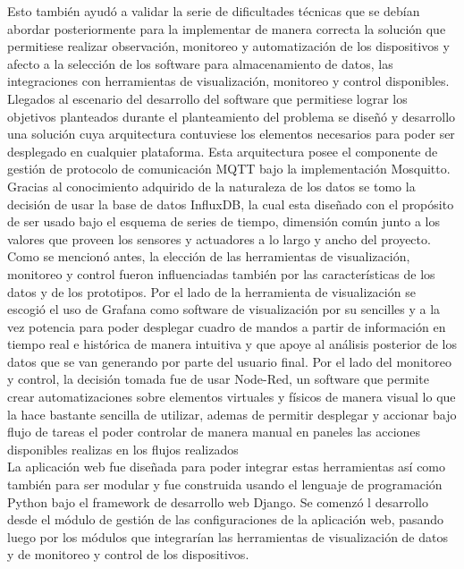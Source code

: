 Esto también ayudó a validar la serie de dificultades técnicas que se debían abordar posteriormente para la implementar de manera correcta la solución que permitiese realizar observación, monitoreo y automatización de los dispositivos y afecto a la selección de los software para almacenamiento de datos, las integraciones con herramientas de visualización, monitoreo y control disponibles.\\

Llegados al escenario del desarrollo del software que permitiese lograr los objetivos planteados durante el planteamiento del problema se diseñó y desarrollo una solución cuya arquitectura contuviese los elementos necesarios para poder ser desplegado en cualquier plataforma. Esta arquitectura posee el componente de gestión de protocolo de comunicación MQTT bajo la implementación Mosquitto. Gracias al conocimiento adquirido de la naturaleza de los datos se tomo la decisión de usar la base de datos InfluxDB, la cual esta diseñado con el propósito de ser usado bajo el esquema de series de tiempo, dimensión común junto a los valores que proveen los sensores y actuadores a lo largo y ancho del proyecto.\\

Como se mencionó antes, la elección de las herramientas de visualización, monitoreo y control fueron influenciadas también por las características de los datos y de los prototipos. Por el lado de la herramienta de visualización se escogió el uso de Grafana como software de visualización por su sencilles y a la vez potencia para poder desplegar cuadro de mandos a partir de información en tiempo real e histórica de manera intuitiva y que apoye al análisis posterior de los datos que se van generando por parte del usuario final. Por el lado del monitoreo y control, la decisión tomada fue de usar Node-Red, un software que permite crear automatizaciones sobre elementos virtuales y físicos de manera visual lo que la hace bastante sencilla de utilizar, ademas de permitir desplegar y accionar bajo flujo de tareas el poder controlar de manera manual en paneles las acciones disponibles realizas en los flujos realizados\\

La aplicación web fue diseñada para poder integrar estas herramientas así como también para ser modular y fue construida usando el lenguaje de programación Python bajo el framework de desarrollo web Django. Se comenzó l desarrollo desde el módulo de gestión de las configuraciones de la aplicación web, pasando luego por los módulos que integrarían las herramientas de visualización de datos y de monitoreo y control de los dispositivos.\\


